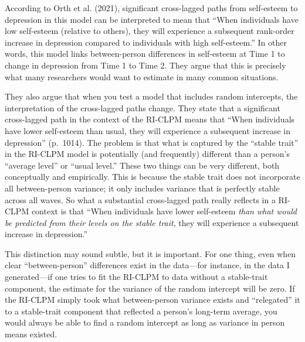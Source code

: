 \documentclass[
  english,
  man,floatsintext]{apa6}
\begin{document}
According to Orth et al. (2021), significant cross-lagged paths from self-esteem to depression in this model can be interpreted to mean that ``When individuals have low self-esteem (relative to others), they will experience a subsequent rank-order increase in depression compared to individuals with high self-esteem.'' In other words, this model links between-person differences in self-esteem at Time 1 to change in depression from Time 1 to Time 2. They argue that this is precisely what many researchers would want to estimate in many common situations.

They also argue that when you test a model that includes random intercepts, the interpretation of the cross-lagged paths change. They state that a significant cross-lagged path in the context of the RI-CLPM means that ``When individuals have lower self-esteem than usual, they will experience a subsequent increase in depression'' (p.~1014). The problem is that what is captured by the ``stable trait'' in the RI-CLPM model is potentially (and frequently) different than a person's ``average level'' or ``usual level.'' These two things can be very different, both conceptually and empirically. This is because the stable trait does not incorporate all between-person variance; it only includes variance that is perfectly stable across all waves. So what a substantial cross-lagged path really reflects in a RI-CLPM context is that ``When individuals have lower self-esteem \emph{than what would be predicted from their levels on the stable trait}, they will experience a subsequent increase in depression.''

This distinction may sound subtle, but it is important. For one thing, even when clear ``between-person'' differences exist in the data---for instance, in the data I generated---if one tries to fit the RI-CLPM to data without a stable-trait component, the estimate for the variance of the random intercept will be zero. If the RI-CLPM simply took what between-person variance exists and ``relegated'' it to a stable-trait component that reflected a person's long-term average, you would always be able to find a random intercept as long as variance in person means existed.
\end{document}
